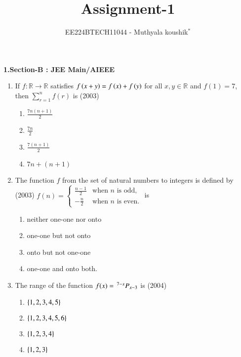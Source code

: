 \documentclass[journal,12pt,twocolumn]{IEEEtran}
\theoremstyle{remark}
\begin{document}

\vspace{3cm}

\title{Assignment-1}
\author{EE224BTECH11044 - Muthyala koushik$^{*}$%
}
\maketitle
\newpage
\bigskip

\renewcommand{\thefigure}{\theenumi}
\renewcommand{\thetable}{\theenumi}

\textbf{1.Section-B : JEE Main/AIEEE}
\begin{enumerate}[start=4]
	\item If $f: \mathbb{R} \to \mathbb{R}$ satisfies $f\left(x+y\right) = f\left(x\right) + f\left(y\right)$ for all $x, y \in \mathbb{R}$ and $f(1) = 7$, then $\sum_{r=1}^n f(r)$ is \hfill(2003)
		
    \begin{enumerate}
        \item $\frac{7n(n+1)}{2}$\\
        \item $\frac{7n}{2}$\\
        \item $\frac{7(n+1)}{2}$\\
        \item $7n + (n+1)$
    \end{enumerate}

    \item The function $f$ from the set of natural numbers to integers is defined by \hfill(2003)
               $f(n) = \begin{cases} \frac{n-1}{2} & \text{when } n \text{ is odd}, \\-\frac{n}{2} & \text{when } n \text{ is even}.\end{cases}$ is

	\begin{enumerate}
		\item neither one-one nor onto
		\item one-one but not onto
		\item onto but not one-one
		\item one-one and onto both.
	\end{enumerate} 

\item The range of the function $f(x)=\,^{7-x}P_{x-3}$ is \hfill(2004)
	\begin{enumerate}
		\item $\left\{1,2,3,4,5\right\}$
		\item $\left\{1,2,3,4,5,6\right\}$
		\item $\left\{1,2,3,4\right\}$
		\item $\left\{1,2,3\right\}$
	\end{enumerate}


\end{enumerate}
\end{document}
